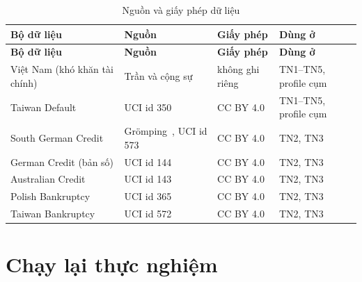 {\footnotesize
\begin{longtable}{@{}>{\raggedright\arraybackslash}p{3.6cm}>{\raggedright\arraybackslash}p{4.6cm}>{\raggedright\arraybackslash}p{2.4cm}>{\raggedright\arraybackslash}p{3.8cm}@{}}
\caption{Nguồn và giấy phép dữ liệu}\label{tab:pl-du-lieu}\\
\toprule
\textbf{Bộ dữ liệu} & \textbf{Nguồn} & \textbf{Giấy phép} & \textbf{Dùng ở} \\
\midrule
\endfirsthead
\toprule
\textbf{Bộ dữ liệu} & \textbf{Nguồn} & \textbf{Giấy phép} & \textbf{Dùng ở} \\
\midrule
\endhead
Việt Nam (khó khăn tài chính) & Trần và cộng sự~\parencite{tran2022distress} & không ghi riêng & TN1--TN5, profile cụm \\
Taiwan Default & UCI id 350~\parencite{uciTaiwanDefault2009} & CC BY 4.0 & TN1--TN5, profile cụm \\
South German Credit & Grömping~\parencite{gromping2019sgc}, UCI id 573 & CC BY 4.0 & TN2, TN3 \\
German Credit (bản số) & UCI id 144~\parencite{uciGermanStatlog1994} & CC BY 4.0 & TN2, TN3 \\
Australian Credit & UCI id 143~\parencite{uciAustralian1987} & CC BY 4.0 & TN2, TN3 \\
Polish Bankruptcy & UCI id 365~\parencite{uciPolish2016} & CC BY 4.0 & TN2, TN3 \\
Taiwan Bankruptcy & UCI id 572~\parencite{uciTaiwanBankruptcy2020} & CC BY 4.0 & TN2, TN3 \\
\bottomrule
\end{longtable}
}

\section*{Chạy lại thực nghiệm}

